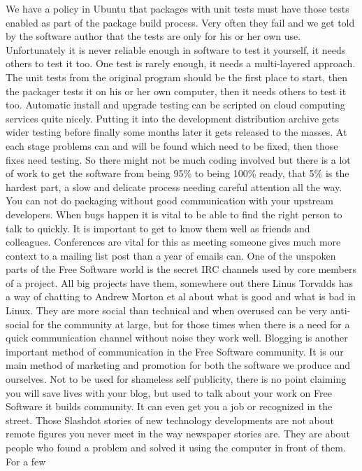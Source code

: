 We have a policy in Ubuntu that packages with unit tests must have those tests
enabled as part of the package build process. Very often they fail and we get
told by the software author that the tests are only for his or her own use.
Unfortunately it is never reliable enough in software to test it yourself, it
needs others to test it too. One test is rarely enough, it needs a multi-layered
approach. The unit tests from the original program should be the first place to
start, then the packager tests it on his or her own computer, then it needs
others to test it too. Automatic install and upgrade testing can be scripted on
cloud computing services quite nicely. Putting it into the development
distribution archive gets wider testing before finally some months later it gets
released to the masses. At each stage problems can and will be found which need
to be fixed, then those fixes need testing. So there might not be much coding
involved but there is a lot of work to get the software from being 95\% to being
100\% ready, that 5\% is the hardest part, a slow and delicate process needing
careful attention all the way.
You can not do packaging without good communication with your upstream
developers. When bugs happen it is vital to be able to find the right person to
talk to quickly. It is important to get to know them well as friends and
colleagues. Conferences are vital for this as meeting someone gives much more
context to a mailing list post than a year of emails can. 
One of the unspoken parts of the Free Software world is the secret IRC channels
used by core members of a project. All big projects have them, somewhere out
there Linus Torvalds has a way of chatting to Andrew Morton et al about what is
good and what is bad in Linux. They are more social than technical and when
overused can be very anti-social for the community at large, but for those times
when there is a need for a quick communication channel without noise they work
well.
Blogging is another important method of communication in the Free Software
community. It is our main method of marketing and promotion for both the
software we produce and ourselves. Not to be used for shameless self publicity,
there is no point claiming you will save lives with your blog, but used to talk
about your work on Free Software it builds community. It can even get you a job
or recognized in the street.
Those Slashdot stories of new technology developments are not about remote
figures you never meet in the way newspaper stories are. They are about people
who found a problem and solved it using the computer in front of them. For a few
